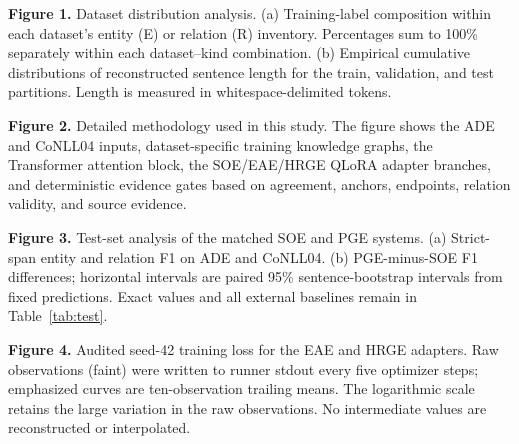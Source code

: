 \noindent\textbf{Figure 1.} Dataset distribution analysis. (a) Training-label composition within
each dataset's entity (E) or relation (R) inventory. Percentages sum to 100\%
separately within each dataset--kind combination. (b) Empirical cumulative
distributions of reconstructed sentence length for the train, validation, and
test partitions. Length is measured in whitespace-delimited tokens.\par

\noindent\textbf{Figure 2.} Detailed methodology used in this study. The figure shows the ADE and
CoNLL04 inputs, dataset-specific training knowledge graphs, the Transformer
attention block, the SOE/EAE/HRGE QLoRA adapter branches, and deterministic
evidence gates based on agreement, anchors, endpoints, relation validity, and
source evidence.\par

\noindent\textbf{Figure 3.} Test-set analysis of the matched SOE and PGE systems. (a) Strict-span
entity and relation F1 on ADE and CoNLL04. (b) PGE-minus-SOE F1 differences;
horizontal intervals are paired 95\% sentence-bootstrap intervals from fixed
predictions. Exact values and all external baselines remain in
Table~\ref{tab:test}.\par

\noindent\textbf{Figure 4.} Audited seed-42 training loss for the EAE and HRGE adapters. Raw
observations (faint) were written to runner stdout every five optimizer steps;
emphasized curves are ten-observation trailing means. The logarithmic scale
retains the large variation in the raw observations. No intermediate values
are reconstructed or interpolated.\par
